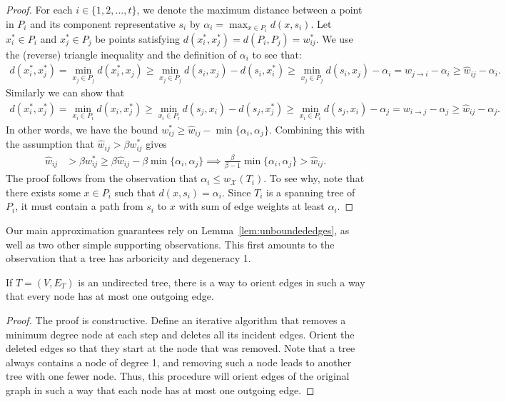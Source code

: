 \begin{proof}
	For each $i \in \{1, 2, \hdots, t\}$, we denote the maximum distance between a point in $P_i$ and its component representative $s_i$ by $\alpha_i = \max_{x \in P_i} d(x, s_i)$.
	Let $x_i^* \in P_i$ and $x_j^* \in P_j$ be points satisfying $d(x_{i}^*, x_{j}^*) = d(P_i, P_j) = w_{ij}^*$.
	We use the (reverse) triangle inequality and the definition of $\alpha_i$ to see that:
	\begin{align*}
		d(x_i^*, x_j^*) = \min_{x_j \in P_j} d(x_i^*, x_j) \geq  \min_{x_j \in P_j} d(s_i, x_j) - d(s_i, x_i^*) \geq  \min_{x_j \in P_j} d(s_i, x_j) - \alpha_i = w_{j \rightarrow i} - \alpha_i \geq \hat{w}_{ij} - \alpha_i.
	\end{align*}
	Similarly we can show that 
	\begin{align*}
		d(x_i^*, x_j^*) = \min_{x_i \in P_i} d(x_i, x_j^*) \geq  \min_{x_i \in P_i} d(s_j, x_i) - d(s_j, x_j^*)  \geq  \min_{x_i \in P_i} d(s_j, x_i) - \alpha_j = w_{i \rightarrow j} - \alpha_j \geq \hat{w}_{ij} - \alpha_j.
	\end{align*}
	In other words, we have the bound $w^*_{ij} \geq \hat{w}_{ij} - \min\{\alpha_i, \alpha_j\}$. Combining this with the assumption that $\hat{w}_{ij} > \beta w_{ij}^*$ gives
	\begin{align*}
		\hat{w}_{ij} &> \beta w_{ij}^* \geq \beta\hat{w}_{ij} - \beta\min \{\alpha_i, \alpha_j\} \implies \frac{\beta}{\beta -1 } \min \{\alpha_i, \alpha_j\}> \hat{w}_{ij}.
	\end{align*}
	The proof follows from the observation that $\alpha_i \leq w_\mathcal{X}(T_i)$. To see why, note that there exists some ${x} \in P_i$ such that $d({x}, s_i) = \alpha_i$. Since $T_i$ is a spanning tree of $P_i$, it must contain a path from $s_i$ to ${x}$ with sum of edge weights at least $\alpha_i$.
\end{proof}
Our main approximation guarantees rely on Lemma~\ref{lem:unboundededges}, as well as two other simple supporting observations. This first amounts to the observation that a tree has arboricity and degeneracy 1.
\begin{observation}
	\label{lem:treeorient}
	If $T = (V,E_T)$ is an undirected tree, there is a way to orient edges in such a way that every node has at most one outgoing edge.
\end{observation}
\begin{proof}
	The proof is constructive. Define an iterative algorithm that removes a minimum degree node at each step and deletes all its incident edges. Orient the deleted edges so that they start at the node that was removed. Note that a tree always contains a node of degree 1, and removing such a node leads to another tree with one fewer node. Thus, this procedure will orient edges of the original graph in such a way that each node has at most one outgoing edge.
\end{proof}
